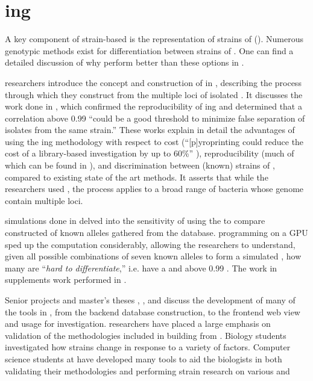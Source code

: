 \section{\Pyro{}ing}
A key component of strain-based \MSTlong{} is the representation of strains of \fiblong{} (\fib{}).
Numerous genotypic methods exist for differentiation between strains of \ecoli{}. 
One can find a detailed discussion of why \pyros{} perform better than these options in \cite{kent2014pyroprinting}.

\cp{} researchers introduce the concept and construction of \pyros{} in \cite{Black2014121, kent2014pyroprinting}, describing the process through which they construct \pyros{} from the multiple loci of isolated \ecoli{} \dna{}.
It discusses the work done in \cite{Shealy:SeniorProject}, which confirmed the reproducibility of \pyro{}ing and determined that a \pearson{} correlation above 0.99 ``could be a good threshold to minimize false separation of isolates from the same strain.''
These works explain in detail the advantages of using the \pyro{}ing methodology with respect to cost (``[p]yroprinting could reduce the cost of a library-based \mst{} investigation by up to 60\%'' \cite{Black2014121}), reproducibility (much of which can be found in \cite{Shealy:SeniorProject}), and discrimination between (known) strains of \ecoli{}, compared to existing state of the art methods.
It asserts that while the researchers used \ecoli{}, the \pyroing{} process applies to a broad range of bacteria whose genome contain multiple loci.

\Silico{} simulations done in \cite{DBLP:conf/bibm/BrandtMSBGK12} delved into the sensitivity of using the \pearson{} \pcfunclabel{} to compare constructed \pyros{} of known \ecoli{} alleles gathered from the \ncbilong{} database.
\cuda{} programming on a GPU sped up the \pcfunclabel{} computation considerably, allowing the researchers to understand, given all possible combinations of seven known alleles to form a simulated \isol{}, how many \isols{} are ``\textit{hard to differentiate},'' i.e. have a \pcsixt{} and \pcfive{} above 0.99 \cite{DBLP:conf/bibm/BrandtMSBGK12}.
The work in \cite{DBLP:conf/bibm/BrandtMSBGK12} supplements \vitro{} work performed in \cite{DBLP:conf/bibm/MontanaDNBK11}.

Senior projects and master's theses \cite{ricketts2014cal}, \cite{soliman2013cplop}, and \cite{webb2011cplop} discuss the development of many of the tools in \cplop{}, from the backend database construction, to the frontend web view and usage for investigation.
\cp{} researchers have placed a large emphasis on validation of the methodologies included in building \pyros{} from \ecoli{} \isols{}.
Biology students investigated how \ecoli{} strains change in response to a variety of factors.
Computer science students at \cp{} have developed many tools to aid the biologists in both validating their methodologies and performing \ecoli{} strain research on various \hosts{} and \spec{}

